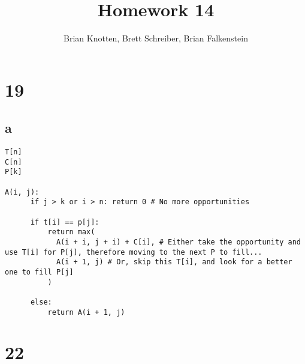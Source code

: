 \documentclass[letterpaper,notitlepage,twoside]{article}
\begin{document}
\title{Homework 14}
\author{Brian Knotten, Brett Schreiber, Brian Falkenstein}
\maketitle

\section*{19}
\subsection*{a}
\begin{verbatim}
T[n]
C[n]
P[k]

A(i, j):
	  if j > k or i > n: return 0 # No more opportunities

	  if t[i] == p[j]:
		  return max(
		  	A(i + i, j + i) + C[i], # Either take the opportunity and use T[i] for P[j], therefore moving to the next P to fill...
		  	A(i + 1, j) # Or, skip this T[i], and look for a better one to fill P[j]
		  )
		
	  else:
		  return A(i + 1, j)
\end{verbatim}

\section*{22}
\end{document}
